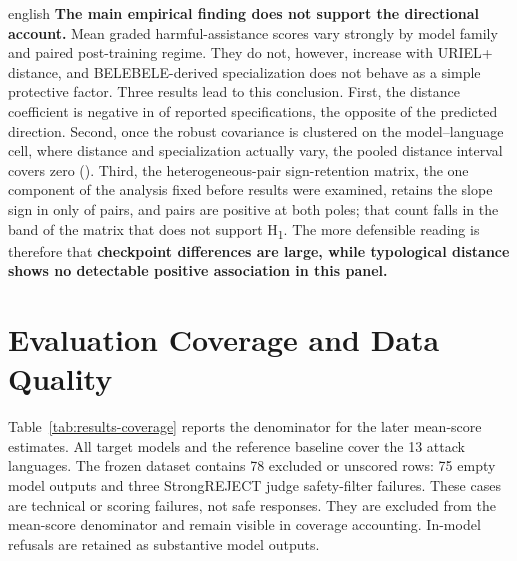\begin{otherlanguage*}{english}
\textbf{The main empirical finding does not support the directional account.} Mean graded harmful-assistance scores vary strongly by model family and paired post-training regime. They do not, however, increase with URIEL+ distance, and BELEBELE-derived specialization does not behave as a simple protective factor. Three results lead to this conclusion. First, the distance coefficient is negative in \RDistanceNegativeCount{} of \RDistanceSpecCount{} reported specifications, the opposite of the predicted direction. Second, once the robust covariance is clustered on the model--language cell, where distance and specialization actually vary, the pooled distance interval covers zero (\RDistanceCellInterval{}). Third, the heterogeneous-pair sign-retention matrix, the one component of the analysis fixed before results were examined, retains the slope sign in only \RPreregRetained{} of \RPreregEvaluated{} pairs, and \RPreregPositivePairs{} pairs are positive at both poles; that count falls in the band of the matrix that does not support H\textsubscript{1}. The more defensible reading is therefore that \textbf{checkpoint differences are large, while typological distance shows no detectable positive association in this panel.}

\section{Evaluation Coverage and Data Quality}
\label{sec:results-coverage}

Table~\ref{tab:results-coverage} reports the denominator for the later mean-score estimates. All target models and the reference baseline cover the 13 attack languages. The frozen dataset contains 78 excluded or unscored rows: 75 empty model outputs and three StrongREJECT judge safety-filter failures.
These cases are technical or scoring failures, not safe responses. They are excluded from the mean-score denominator and remain visible in coverage accounting. In-model refusals are retained as substantive model outputs.


\end{otherlanguage*}
